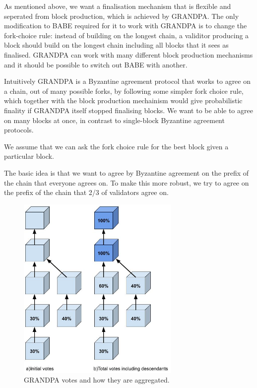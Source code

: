 As mentioned above, we want a finalisation mechanism that is flexible and seperated from block production, which is achieved by GRANDPA. The only modification to BABE required for it to work with GRANDPA is to change the fork-choice rule: instead of building on the longest chain, a validitor producing a block should build on the longest chain including all blocks that it sees as finalised. GRANDPA can work with many different block production mechanisms and it should be possible to switch out BABE with another.

Intuitively GRANDPA is a Byzantine agreement protocol that works to agree on a chain, out of many possible forks, by following some simpler fork choice rule, which together with the block production mechainism would give probabilistic finality if GRANDPA itself stopped finalising blocks. We want to be able to agree on many blocks at once, in contrast to single-block Byzantine agreement protocols.

We assume that we can ask the fork choice rule for the best block given a particular block. 

The basic idea is that we want to agree by Byzantine agreement on the prefix of the chain that everyone agrees on. To make this more robust, we try to agree on the prefix of the chain that 2/3 of validators agree on.

\begin{figure}[h!]
  \centering
  \includegraphics[width=0.7\textwidth]{images/Grandpa.jpg}
  \caption{GRANDPA votes and how they are aggregated. }
    \label{fig:grandpa}
\end{figure}

